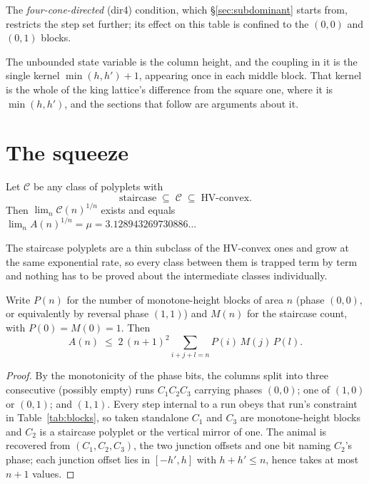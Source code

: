 \documentclass[11pt]{article}
\begin{document}
The \emph{four-cone-directed} (dir4) condition, which \S\ref{sec:subdominant}
starts from, restricts the step set further; its effect on this table is
confined to the $(0,0)$ and $(0,1)$ blocks.

The unbounded state variable is the column height, and the coupling in it is
the single kernel $\min(h,h')+1$, appearing once in each middle block. That
kernel is the whole of the king lattice's difference from the square one, where
it is $\min(h,h')$, and the sections that follow are arguments about it.

\section{The squeeze}
\label{sec:squeeze}

\begin{proposition}
\label{prop:squeeze}
Let $\mathcal C$ be any class of polyplets with
\[
  \text{staircase} \;\subseteq\; \mathcal C \;\subseteq\; \text{HV-convex}.
\]
Then $\lim_n \mathcal C(n)^{1/n}$ exists and equals
$\lim_n A(n)^{1/n} = \mu = 3.128943269730886\dots$
\end{proposition}

The staircase polyplets are a thin subclass of the HV-convex ones and grow at the
same exponential rate, so every class between them is trapped term by term and
nothing has to be proved about the intermediate classes individually.

\begin{lemma}
\label{lem:blocks}
Write $P(n)$ for the number of monotone-height blocks of area $n$ (phase
$(0,0)$, or equivalently by reversal phase $(1,1)$) and $M(n)$ for the staircase
count, with $P(0) = M(0) = 1$. Then
\begin{equation}
  A(n) \;\le\; 2\,(n{+}1)^2 \sum_{i+j+l=n} P(i)\,M(j)\,P(l) .
  \label{eq:factor}
\end{equation}
\end{lemma}

\begin{proof}
By the monotonicity of the phase bits, the columns split into three consecutive
(possibly empty) runs $C_1C_2C_3$ carrying phases $(0,0)$; one of $(1,0)$ or
$(0,1)$; and $(1,1)$. Every step internal to a run obeys that run's constraint
in Table~\ref{tab:blocks}, so taken standalone $C_1$ and $C_3$ are
monotone-height blocks and $C_2$ is a staircase polyplet or the vertical mirror of
one. The animal is recovered from $(C_1,C_2,C_3)$, the two junction offsets and
one bit naming $C_2$'s phase; each junction offset lies in $[-h', h]$ with
$h + h' \le n$, hence takes at most $n+1$ values.
\end{proof}
\end{document}
